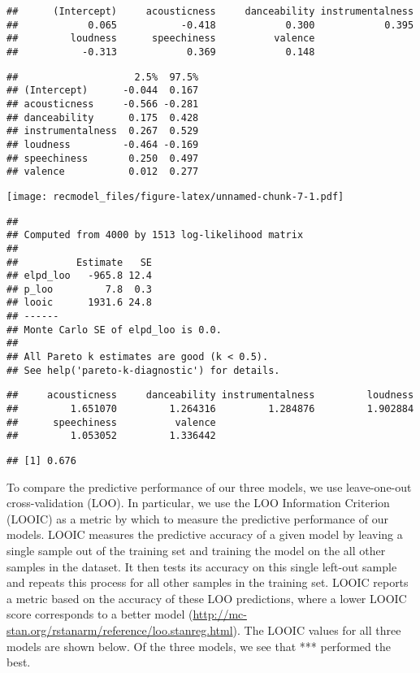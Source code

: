 \documentclass[
]{article}
\begin{document}
\begin{verbatim}
##      (Intercept)     acousticness     danceability instrumentalness 
##            0.065           -0.418            0.300            0.395 
##         loudness      speechiness          valence 
##           -0.313            0.369            0.148
\end{verbatim}

\begin{verbatim}
##                    2.5%  97.5%
## (Intercept)      -0.044  0.167
## acousticness     -0.566 -0.281
## danceability      0.175  0.428
## instrumentalness  0.267  0.529
## loudness         -0.464 -0.169
## speechiness       0.250  0.497
## valence           0.012  0.277
\end{verbatim}

\texttt{[image: recmodel\_files/figure-latex/unnamed-chunk-7-1.pdf]}

\begin{verbatim}
## 
## Computed from 4000 by 1513 log-likelihood matrix
## 
##          Estimate   SE
## elpd_loo   -965.8 12.4
## p_loo         7.8  0.3
## looic      1931.6 24.8
## ------
## Monte Carlo SE of elpd_loo is 0.0.
## 
## All Pareto k estimates are good (k < 0.5).
## See help('pareto-k-diagnostic') for details.
\end{verbatim}

\begin{verbatim}
##     acousticness     danceability instrumentalness         loudness 
##         1.651070         1.264316         1.284876         1.902884 
##      speechiness          valence 
##         1.053052         1.336442
\end{verbatim}

\begin{verbatim}
## [1] 0.676
\end{verbatim}

To compare the predictive performance of our three models, we use
leave-one-out cross-validation (LOO). In particular, we use the LOO
Information Criterion (LOOIC) as a metric by which to measure the
predictive performance of our models. LOOIC measures the predictive
accuracy of a given model by leaving a single sample out of the training
set and training the model on the all other samples in the dataset. It
then tests its accuracy on this single left-out sample and repeats this
process for all other samples in the training set. LOOIC reports a
metric based on the accuracy of these LOO predictions, where a lower
LOOIC score corresponds to a better model
(\url{http://mc-stan.org/rstanarm/reference/loo.stanreg.html}). The
LOOIC values for all three models are shown below. Of the three models,
we see that *** performed the best.
\end{document}
